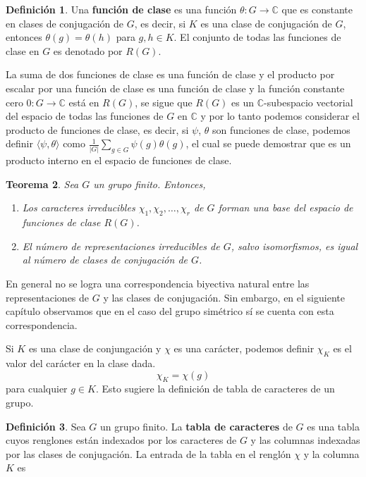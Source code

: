 \documentclass[12pt]{book}
\newtheorem{theorem}{Teorema}[section]
\theoremstyle{definition}
\newtheorem{definition}[theorem]{Definición}
\newcounter{in}
\newcounter{ini}
\begin{document}
\begin{definition}
  Una \textbf{función de clase} es una función
  $\theta:G\rightarrow\mathbb{C}$ que es constante en clases de
  conjugación de $G$, es decir, si $K$ es una clase de conjugación de
  $G$, entonces $\theta(g)=\theta(h)$ para $g,h\in K$. El conjunto de
  todas las funciones de clase en $G$ es denotado por $R(G)$.
\end{definition}
La suma de dos funciones de clase es una función de clase y el
producto por escalar por una función de clase es una función de clase
y la función constante cero $0:G\rightarrow \mathbb{C}$ está en
$R(G)$, se sigue que $R(G)$ es un $\mathbb{C}$-subespacio vectorial
del espacio de todas las funciones  de $G$ en $\mathbb{C}$ y por lo
tanto podemos considerar el producto de funciones de clase, es decir,
si $\psi$, $\theta$ son funciones de clase, podemos definir
$\langle\psi,\theta\rangle$ como $\frac{1}{|G|}\sum_{g\in
  G}\psi(g)\theta(g)$, el cual se puede demostrar que es un producto
interno en el espacio de funciones de clase. 
\begin{theorem}
  \label{no-rep-irr-no-cla-conj}
  Sea $G$ un grupo finito. Entonces,
  \begin{enumerate}
  \item Los caracteres irreducibles
    $\chi_{1},\chi_{2},\ldots,\chi_{r}$ de $G$ forman una base del
    espacio de funciones de clase $R(G)$.
    \item El número de representaciones irreducibles de $G$, salvo
      isomorfismos, es igual al número de clases de conjugación de $G$.
  \end{enumerate}
\end{theorem}
En general no se logra una correspondencia biyectiva natural entre las
representaciones de $G$ y las clases de conjugación. Sin embargo, en
el siguiente capítulo observamos que en el caso del grupo simétrico sí se cuenta con
esta correspondencia.

Si $K$ es una clase de conjungación y $\chi$ es una carácter, podemos
definir $\chi_{K}$ es el valor del carácter en la clase dada.
\begin{equation*}
  \chi_{K}=\chi(g)
\end{equation*}
para cualquier $g\in K$. Esto sugiere la definición de tabla de caracteres de
un grupo. 
\begin{definition}
  Sea $G$ un grupo finito. La \textbf{tabla de caracteres} de $G$ es
  una tabla cuyos renglones están indexados por los caracteres de $G$
  y las columnas indexadas por las clases de conjugación. La entrada
  de la tabla en el renglón $\chi$ y la columna $K$ es
\end{definition}
\end{document}
